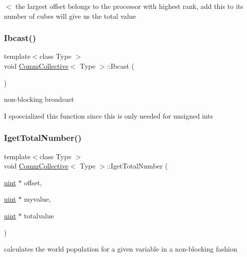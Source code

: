 $<$ the largest offset belongs to the processor with highest rank, add this to its number of cubes will give us the total value \mbox{\label{classCommCollective_af79e85456fe4bf007ccb6ad0c7e41151}} 
\subsubsection{\texorpdfstring{Ibcast()}{Ibcast()}}
{\footnotesize\ttfamily template$<$class Type $>$ \\
void \mbox{\hyperlink{classCommCollective}{Comm\+Collective}}$<$ Type $>$\+::Ibcast (\begin{DoxyParamCaption}{ }\end{DoxyParamCaption})}

non-\/blocking broadcast

I spoecialized this function since this is only needed for unsigned ints \mbox{\label{classCommCollective_a0b8611d0fce41f5b6629ebf702e7aa4b}} 
\subsubsection{\texorpdfstring{Iget\+Total\+Number()}{IgetTotalNumber()}\hspace{0.1cm}{\footnotesize\ttfamily [1/2]}}
{\footnotesize\ttfamily template$<$class Type $>$ \\
void \mbox{\hyperlink{classCommCollective}{Comm\+Collective}}$<$ Type $>$\+::Iget\+Total\+Number (\begin{DoxyParamCaption}\item[{\mbox{\hyperlink{definitions_8h_a69aa29b598b851b0640aa225a9e5d61d}{uint}} $\ast$}]{offset,  }\item[{\mbox{\hyperlink{definitions_8h_a69aa29b598b851b0640aa225a9e5d61d}{uint}} $\ast$}]{myvalue,  }\item[{\mbox{\hyperlink{definitions_8h_a69aa29b598b851b0640aa225a9e5d61d}{uint}} $\ast$}]{totalvalue }\end{DoxyParamCaption})}

calculates the world population for a given variable in a non-\/blocking fashion \mbox{\label{classCommCollective_a2603f0331222a5f76a29a0bf3a187ae4}} 

